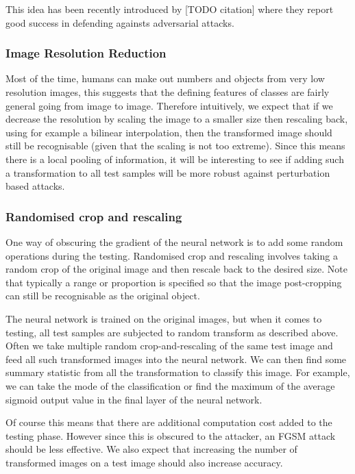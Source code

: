 This idea has been recently introduced by [TODO citation] where they report good success in defending againsts adversarial attacks.


\subsubsection{Image Resolution Reduction}
Most of the time, humans can make out numbers and objects from very low resolution images, this suggests that the defining features of classes are fairly general going from image to image. Therefore intuitively, we expect that if we decrease the resolution by scaling the image to a smaller size then rescaling back, using for example a bilinear interpolation, then the transformed image should still be recognisable (given that the scaling is not too extreme). Since this means there is a local pooling of information, it will be interesting to see if adding such a transformation to all test samples will be more robust against perturbation based attacks.

\subsubsection{Randomised crop and rescaling}
One way of obscuring the gradient of the neural network is to add some random operations during the testing. Randomised crop and rescaling involves taking a random crop of the original image and then rescale back to the desired size. Note that typically a range or proportion is specified so that the image post-cropping can still be recognisable as the original object. 

The neural network is trained on the original images, but when it comes to testing, all test samples are subjected to random transform as described above. Often we take multiple random crop-and-rescaling of the same test image and feed all such transformed images into the neural network. We can then find some summary statistic from all the transformation to classify this image. For example, we can take the mode of the classification or find the maximum of the average sigmoid output value in the final layer of the neural network. 

Of course this means that there are additional computation cost added to the testing phase. However since this is obscured to the attacker, an FGSM attack should be less effective. We also expect that increasing the number of transformed images on a test image should also increase accuracy.

